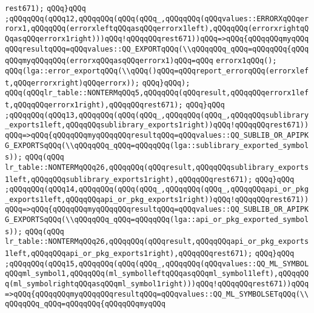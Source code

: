 \verb|rest671);|\newline
\verb|qQQq}qQQq|\newline
\verb|;qQQqqQQq(qQQq12,qQQqqQQq(qQQq(qQQq_,qQQqqQQq(qQQqvalues::ERRORXqQQqerrorx1,qQQqqQQq(errorxleftqQQqasqQQqerrorx1left),qQQqqQQq(errorxrightqQQqasqQQqerrorx1right)))qQQq!qQQqqQQqrest671))qQQq=>qQQq{qQQqqQQqmyqQQqqQQqresultqQQq=qQQqvalues::QQ_EXPORTqQQq(\\qQQqqQQq_qQQq=qQQqqQQq{qQQqqQQqmyqQQqqQQq(errorxqQQqasqQQqerrorx1)qQQq=qQQq|\newline
\verb|errorx1qQQq();|\newline
\verb|qQQq(lga::error_exportqQQq(\\qQQq()qQQq=qQQqreport_errorqQQq(errorxleft,qQQqerrorxright)qQQqerrorx));|\newline
\verb|qQQq}qQQq);|\newline
\verb|qQQq(qQQqlr_table::NONTERMqQQq5,qQQqqQQq(qQQqresult,qQQqqQQqerrorx1left,qQQqqQQqerrorx1right),qQQqqQQqrest671);|\newline
\verb|qQQq}qQQq|\newline
\verb|;qQQqqQQq(qQQq13,qQQqqQQq(qQQq(qQQq_,qQQqqQQq(qQQq_,qQQqqQQqsublibrary_exports1left,qQQqqQQqsublibrary_exports1right))qQQq!qQQqqQQqrest671))qQQq=>qQQq{qQQqqQQqmyqQQqqQQqresultqQQq=qQQqvalues::QQ_SUBLIB_OR_APIPKG_EXPORTSqQQq(\\qQQqqQQq_qQQq=qQQqqQQq(lga::sublibrary_exported_symbols));|\newline
\verb|qQQq(qQQq|\newline
\verb|lr_table::NONTERMqQQq26,qQQqqQQq(qQQqresult,qQQqqQQqsublibrary_exports1left,qQQqqQQqsublibrary_exports1right),qQQqqQQqrest671);|\newline
\verb|qQQq}qQQq|\newline
\verb|;qQQqqQQq(qQQq14,qQQqqQQq(qQQq(qQQq_,qQQqqQQq(qQQq_,qQQqqQQqapi_or_pkg_exports1left,qQQqqQQqapi_or_pkg_exports1right))qQQq!qQQqqQQqrest671))qQQq=>qQQq{qQQqqQQqmyqQQqqQQqresultqQQq=qQQqvalues::QQ_SUBLIB_OR_APIPKG_EXPORTSqQQq(\\qQQqqQQq_qQQq=qQQqqQQq(lga::api_or_pkg_exported_symbols));|\newline
\verb|qQQq(qQQq|\newline
\verb|lr_table::NONTERMqQQq26,qQQqqQQq(qQQqresult,qQQqqQQqapi_or_pkg_exports1left,qQQqqQQqapi_or_pkg_exports1right),qQQqqQQqrest671);|\newline
\verb|qQQq}qQQq|\newline
\verb|;qQQqqQQq(qQQq15,qQQqqQQq(qQQq(qQQq_,qQQqqQQq(qQQqvalues::QQ_ML_SYMBOLqQQqml_symbol1,qQQqqQQq(ml_symbolleftqQQqasqQQqml_symbol1left),qQQqqQQq(ml_symbolrightqQQqasqQQqml_symbol1right)))qQQq!qQQqqQQqrest671))qQQq=>qQQq{qQQqqQQqmyqQQqqQQqresultqQQq=qQQqvalues::QQ_ML_SYMBOLSETqQQq(\\qQQqqQQq_qQQq=qQQqqQQq{qQQqqQQqmyqQQq|\newline
